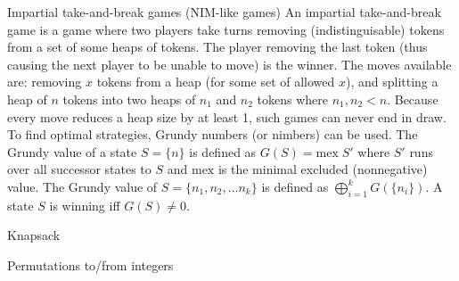 \clearpage
{}
\categorycontents{}



\begin{algorithm}{Impartial take-and-break games (NIM-like games)}
\desc
An impartial take-and-break game is a game where two players take
turns removing (indistinguisable) tokens from a set of some heaps of
tokens.  The player removing the last token (thus causing the next
player to be unable to move) is the winner.  The moves available are:
removing $x$ tokens from a heap (for some set of allowed $x$), and
splitting a heap of $n$ tokens into two heaps of $n_1$ and $n_2$
tokens where $n_1, n_2 < n$.  Because every move reduces a heap size
by at least 1, such games can never end in draw.  To find optimal
strategies, Grundy numbers (or nimbers) can be used.  The Grundy value
of a state $S = \{n\}$ is defined as $G(S) =
\mathrm{mex}\;S'$ where $S'$ runs over all successor states to $S$ and
$\mathrm{mex}$ is the minimal excluded (nonnegative) value.  The
Grundy value of $S =
\{n_1, n_2, \ldots n_k\}$ is defined as $\bigoplus_{i=1}^{k}
G(\{n_i\})$.  A state $S$ is winning iff $G(S) \ne 0$.

\end{algorithm}


\begin{algorithm}{Knapsack}
\end{algorithm}


\begin{algorithm}{Permutations to/from integers}
\end{algorithm}



